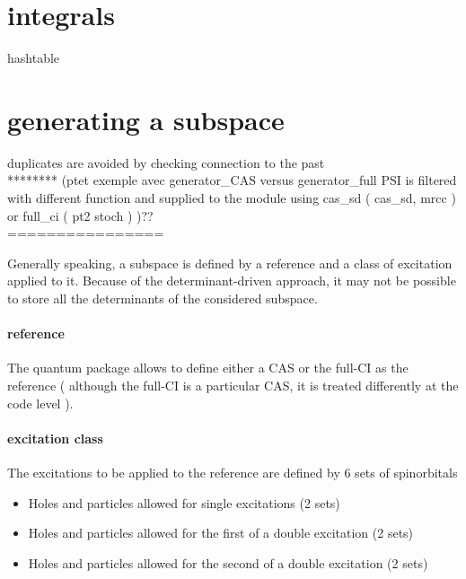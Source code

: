 \documentclass[./thesis.tex]{subfiles}
\begin{document}


\section{integrals}
hashtable \\

\section{generating a subspace}
duplicates are avoided by checking connection to the past \\
******** (ptet exemple avec generator\_CAS versus generator\_full PSI is filtered with different function and supplied to the module using cas\_sd ( cas\_sd, mrcc ) or full\_ci ( pt2 stoch ) )?? \\
================

Generally speaking, a subspace is defined by a reference and a class of excitation applied to it. Because of the determinant-driven approach, it may not be possible to store all the determinants of the considered subspace. 



\paragraph{reference}

The quantum package allows to define either a CAS or the full-CI as the reference ( although the full-CI is a particular CAS, it is treated differently at the code level ).

\paragraph{excitation class}
The excitations to be applied to the reference are defined by 6 sets of spinorbitals
\begin{itemize}
\item
Holes and particles allowed for single excitations (2 sets)
\item
Holes and particles allowed for the first of a double excitation (2 sets)
\item
Holes and particles allowed for the second of a double excitation (2 sets)
\end{itemize}
\end{document}
